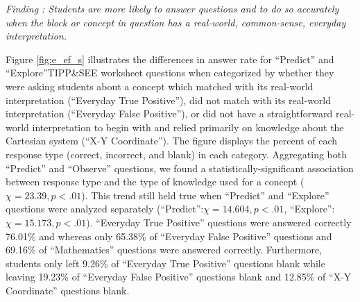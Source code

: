 \documentclass[sigconf,manuscript,review,anonymous]{acmart} %
\def\ts{TIPP\&SEE}
\begin{document}
\textit{Finding : Students are more likely to answer questions and to do so accurately when the block or concept in question has a real-world, common-sense, everyday interpretation.}



Figure \ref{fig:e_ef_s} illustrates the differences in answer rate for ``Predict'' and ``Explore''\ts{} worksheet questions when categorized by whether they were asking students about a concept which matched with its real-world interpretation (``Everyday True Positive''), did not match with its real-world interpretation (``Everyday False Positive''), or did not have a straightforward real-world interpretation to begin with and relied primarily on knowledge about the Cartesian system (``X-Y Coordinate''). The figure displays the percent of each response type (correct, incorrect, and blank) in each category. Aggregating both ``Predict'' and ``Observe'' questions, we found a statistically-significant association between response type and the type of knowledge used for a concept (\begin{math}\chi=23.39, p<.01\end{math}). This trend still held true when ``Predict'' and ``Explore'' questions were analyzed separately (``Predict'':\begin{math}\chi=14.604, p<.01\end{math}, ``Explore'':\begin{math}\chi=15.173, p<.01\end{math}). ``Everyday True Positive'' questions were answered correctly 76.01\% and whereas only 65.38\% of ``Everyday False Positive'' questions and 69.16\% of ``Mathematics'' questions were answered correctly. Furthermore, students only left 9.26\% of ``Everyday True Positive'' questions blank while leaving 19.23\% of ``Everyday False Positive'' questions blank and 12.85\% of ``X-Y Coordinate'' questions blank. 
\end{document}
